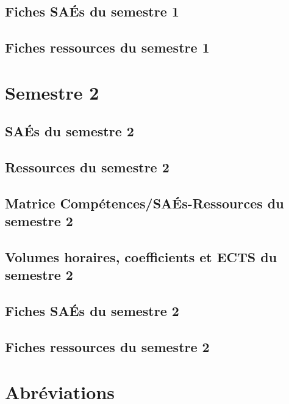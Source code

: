 \documentclass[10pt,lualatex,french]{article}
\begin{document}


\newpage

\subsection{Fiches SAÉs du semestre 1}
\affichageSAE{\sem}
\newpage

\subsection{Fiches ressources du semestre 1}
\affichageRessource{\sem}

\section{Semestre 2}
\def\sem{B} %

\subsection{SAÉs du semestre 2}

\listeTitreSAE{\sem}

\subsection{Ressources du semestre 2}

\listeTitreRessourceIndex{\sem} 

\subsection{Matrice Compétences/SAÉs-Ressources du semestre 2}

\scalebox{0.95}{}

\subsection{Volumes horaires, coefficients et ECTS du semestre 2}



\newpage

\subsection{Fiches SAÉs du semestre 2}
\affichageSAE{\sem}

\subsection{Fiches ressources du semestre 2}
\affichageRessource{\sem}

\section{Abréviations}

\begin{multicols}{2}\small

\end{multicols}
\end{document}
